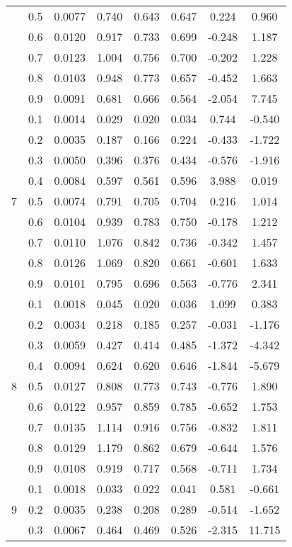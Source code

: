\documentclass[11pt,a4paper]{report}
\begin{document}
\begin{longtable}{ | c | c || c | c | c | c | c | c | }
 & 0.5 & 0.0077 & 0.740 & 0.643 & 0.647 & 0.224 & 0.960 \\
 & 0.6 & 0.0120 & 0.917 & 0.733 & 0.699 & -0.248 & 1.187 \\
 & 0.7 & 0.0123 & 1.004 & 0.756 & 0.700 & -0.202 & 1.228 \\
 & 0.8 & 0.0103 & 0.948 & 0.773 & 0.657 & -0.452 & 1.663 \\
 & 0.9 & 0.0091 & 0.681 & 0.666 & 0.564 & -2.054 & 7.745 \\
 \hline
\multirow{9}{*}{7} & 0.1 & 0.0014 & 0.029 & 0.020 & 0.034 & 0.744 & -0.540 \\
 & 0.2 & 0.0035 & 0.187 & 0.166 & 0.224 & -0.433 & -1.722 \\
 & 0.3 & 0.0050 & 0.396 & 0.376 & 0.434 & -0.576 & -1.916 \\
 & 0.4 & 0.0084 & 0.597 & 0.561 & 0.596 & 3.988 & 0.019 \\
 & 0.5 & 0.0074 & 0.791 & 0.705 & 0.704 & 0.216 & 1.014 \\
 & 0.6 & 0.0104 & 0.939 & 0.783 & 0.750 & -0.178 & 1.212 \\
 & 0.7 & 0.0110 & 1.076 & 0.842 & 0.736 & -0.342 & 1.457 \\
 & 0.8 & 0.0126 & 1.069 & 0.820 & 0.661 & -0.601 & 1.633 \\
 & 0.9 & 0.0101 & 0.795 & 0.696 & 0.563 & -0.776 & 2.341 \\
 \hline
\multirow{9}{*}{8} & 0.1 & 0.0018 & 0.045 & 0.020 & 0.036 & 1.099 & 0.383 \\
 & 0.2 & 0.0034 & 0.218 & 0.185 & 0.257 & -0.031 & -1.176 \\
 & 0.3 & 0.0059 & 0.427 & 0.414 & 0.485 & -1.372 & -4.342 \\
 & 0.4 & 0.0094 & 0.624 & 0.620 & 0.646 & -1.844 & -5.679 \\
 & 0.5 & 0.0127 & 0.808 & 0.773 & 0.743 & -0.776 & 1.890 \\
 & 0.6 & 0.0122 & 0.957 & 0.859 & 0.785 & -0.652 & 1.753 \\
 & 0.7 & 0.0135 & 1.114 & 0.916 & 0.756 & -0.832 & 1.811 \\
 & 0.8 & 0.0129 & 1.179 & 0.862 & 0.679 & -0.644 & 1.576 \\
 & 0.9 & 0.0108 & 0.919 & 0.717 & 0.568 & -0.711 & 1.734 \\
 \hline
\multirow{9}{*}{9} & 0.1 & 0.0018 & 0.033 & 0.022 & 0.041 & 0.581 & -0.661 \\
 & 0.2 & 0.0035 & 0.238 & 0.208 & 0.289 & -0.514 & -1.652 \\
 & 0.3 & 0.0067 & 0.464 & 0.469 & 0.526 & -2.315 & 11.715 \\

\end{longtable}
\end{document}
